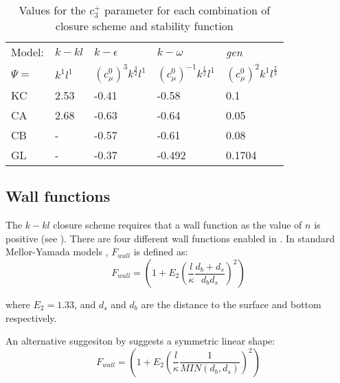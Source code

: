 \begin{table}[b]
\begin{center}
\begin{tabular}{lllll}\hline
Model: & $k-kl$   & $k-\epsilon$                  & $k-\omega$                       & \emph{gen}       \\
$\Psi=$& $k^1l^1$ & $\left(c_\mu^0\right)^3k^\frac{3}{2}l^1$ & $\left(c_\mu^0\right)^{-1}k^\frac{1}{2}l^1$ & $\left(c_\mu^0\right)^2k^1l^\frac{2}{3}$  \\ \hline
KC                   & 2.53            & -0.41          & -0.58         & 0.1         \\
CA                   & 2.68            & -0.63          & -0.64         & 0.05        \\
CB                   &  -              & -0.57          & -0.61         & 0.08        \\
GL                   &  -              & -0.37          & -0.492        & 0.1704      \\
\end{tabular}
\end{center}
\caption{Values for the $c_3^+$ parameter for each combination of closure scheme and stability function}
\label{tab:c3minus}
\end{table}


\subsection{Wall functions}
\label{sec:wall_functions}

The $k-kl$ closure scheme requires that a wall function as the value of $n$ is positive (see \citet{umlauf2003}). There
are four different wall functions enabled in \fluidity. In standard Mellor-Yamada models \citep{mellor1982}, $F_{wall}$ is defined as:
\begin{equation}
F_{wall} = \left(1+E_2 \left(\frac{l}{\kappa} \frac{d_b + d_s}{d_b d_s}\right)^2\right)
\end{equation}

\noindent
where $E_2=1.33$, and $d_s$ and $d_b$ are the distance to the surface and bottom respectively.

An alternative suggesiton by \citet{burchard1998} suggests a symmetric linear shape:
\begin{equation}
F_{wall} = \left(1+E_2 \left(\frac{l}{\kappa} \frac{1}{MIN\left(d_b,d_s\right)}\right)^2\right)
\end{equation}

